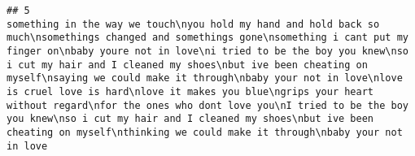 \documentclass[]{article}
\begin{document}
\begin{verbatim}
## 5                                                                                                                                                                                                                                                                                                                                                                                                                                                                                                                                                                                                                                                                                                                                                                                                                                                                                                                                                                                                                                                                                                                                                                                                                                                         something in the way we touch\nyou hold my hand and hold back so much\nsomethings changed and somethings gone\nsomething i cant put my finger on\nbaby youre not in love\ni tried to be the boy you knew\nso i cut my hair and I cleaned my shoes\nbut ive been cheating on myself\nsaying we could make it through\nbaby your not in love\nlove is cruel love is hard\nlove it makes you blue\ngrips your heart without regard\nfor the ones who dont love you\nI tried to be the boy you knew\nso i cut my hair and I cleaned my shoes\nbut ive been cheating on myself\nthinking we could make it through\nbaby your not in love

\end{verbatim}
\end{document}
